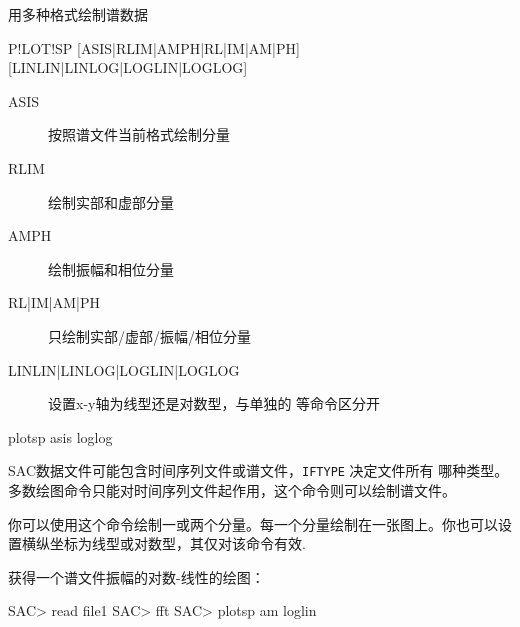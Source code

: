 \label{cmd:plotsp}

用多种格式绘制谱数据

\begin{SACSTX}
P!LOT!SP [ASIS|RLIM|AMPH|RL|IM|AM|PH] [LINLIN|LINLOG|LOGLIN|LOGLOG]
\end{SACSTX}

\begin{description}
\item [ASIS] 按照谱文件当前格式绘制分量
\item [RLIM] 绘制实部和虚部分量
\item [AMPH] 绘制振幅和相位分量
\item [RL|IM|AM|PH] 只绘制实部/虚部/振幅/相位分量
\item [LINLIN|LINLOG|LOGLIN|LOGLOG] 设置x-y轴为线型还是对数型，与单独的
     等命令区分开
\end{description}

\begin{SACDFT}
plotsp asis loglog
\end{SACDFT}

SAC数据文件可能包含时间序列文件或谱文件，\texttt{IFTYPE} 决定文件所有
哪种类型。多数绘图命令只能对时间序列文件起作用，这个命令则可以绘制谱文件。

你可以使用这个命令绘制一或两个分量。每一个分量绘制在一张图上。你也可以设
置横纵坐标为线型或对数型，其仅对该命令有效.

获得一个谱文件振幅的对数-线性的绘图：
\begin{SACCode}
SAC> read file1
SAC> fft
SAC> plotsp am loglin
\end{SACCode}
